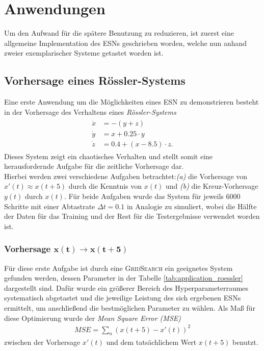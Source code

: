 \section{Anwendungen}
\label{chp:applications}
Um den Aufwand für die spätere Benutzung zu reduzieren, ist zuerst eine allgemeine Implementation des \textsc{ESN}s geschrieben worden, welche nun anhand zweier exemplarischer Systeme getastet worden ist.

\subsection{Vorhersage eines Rössler-Systems}
Eine erste Anwendung um die Möglichkeiten eines \textsc{ESN} zu demonstrieren besteht in der Vorhersage des Verhaltens eines \textit{Rössler-Systems}
\begin{align}
\label{eq:application_roessler_pde}
\begin{split}
\dot{x} &= -(y+z)\\
\dot{y} &= x + 0.25 \cdot  y\\
\dot{z} &= 0.4 + (x - 8.5)\cdot z.
\end{split}
\end{align}
Dieses System zeigt ein chaotisches Verhalten und stellt somit eine herausfordernde Aufgabe für die zeitliche Vorhersage dar.\\
Hierbei werden zwei verschiedene Aufgaben betrachtet:\textit{(a)} die Vorhersage von $x'(t) \approx x(t+5)$ durch die Kenntnis von $x(t)$ und \textit{(b)} die Kreuz-Vorhersage $y(t)$ durch $x(t)$. Für beide Aufgaben wurde das System für jeweils $6000$ Schritte mit einer Abtastrate $\Delta t = 0.1$ in Analogie zu \cite{parlitz2005} simuliert, wobei die Hälfte der Daten für das Training und der Rest für die Testergebnisse verwendet worden ist.

\subsubsection[Vorhersage $x(t) \rightarrow x(t+5)$]{Vorhersage $\pmb{x(t) \rightarrow x(t+5)}$}
Für diese erste Aufgabe ist durch eine \textsc{GridSearch} ein geeignetes System gefunden werden, dessen Parameter in der Tabelle \ref{tab:application_roessler} dargestellt sind. Dafür wurde ein größerer Bereich des Hyperparameterraumes systematisch abgetastet und die jeweilige Leistung des sich ergebenen \textsc{ESN}s ermittelt, um anschließend die bestmöglichen Parameter zu wählen. Als Maß für diese Optimierung wurde der \textit{Mean Square Error (MSE)}
\begin{align}
MSE = \sum_n \left(x(t+5) - x'(t) \right)^2
\end{align}
zwischen der Vorhersage $x'(t)$ und dem tatsächlichem Wert $x(t+5)$ benutzt.

